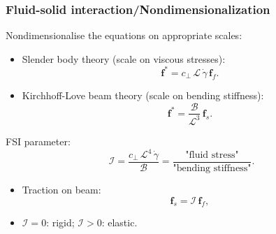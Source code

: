 \documentclass{beamer}
\newcommand{\bi}{\begin{itemize}}
\newcommand{\ei}{\end{itemize}}
\begin{document}
\begin{frame}
	\frametitle{Fluid-solid interaction/Nondimensionalization}
	\begin{overlayarea}{\textwidth}{\textheight}\vspace{-0.5cm}
	\small Nondimensionalise the equations on appropriate scales:
	\bi 
	\item Slender body theory (scale on viscous stresses):\vspace{-0.1cm}
	\begin{equation*}
		\mathbf{f}^*=c_\perp\,\mathcal{L}\,\dot{\gamma}\,\mathbf{f}_{f}.
	\end{equation*}
    \item Kirchhoff-Love beam theory (scale on bending stiffness):\vspace{-0.1cm}
    \begin{equation*}
    	\mathbf{f}^*=\frac{\mathscr{B}}{\mathcal{L}^3}\,\mathbf{f}_{s}.
    \end{equation*}
    \ei 
   	\vspace{-0.2cm} FSI parameter: 
   	\begin{equation*}
   		\label{eqn:38}
   		\mathcal{I}=\frac{c_\perp\,\mathcal{L}^4\,\dot{\gamma}}{\mathscr{B}}=\frac{\text{"fluid stress"}}{\text{"bending stiffness"}}.
   	\end{equation*}
   \vspace{-0.3cm}\small \bi
   \item Traction on beam:
	\begin{equation*}
		\textbf{f}_{s}=\mathcal{I}\,\textbf{f}_{f},
	\end{equation*}
			 \item $\mathcal{I}=0$: rigid; \quad $\mathcal{I}>0$: elastic.
			 \ei
	\end{overlayarea}
\end{frame}



\end{document}
